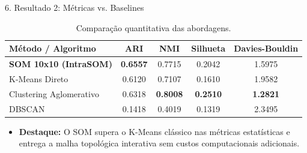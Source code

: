 \documentclass[10pt,aspectratio=169]{beamer}
\begin{document}
\begin{frame}{6. Resultado 2: Métricas vs. Baselines}
  \begin{table}
    \centering
    \begin{tabular}{lcccc}
      \toprule
      Método / Algoritmo & ARI & NMI & Silhueta & Davies-Bouldin \\
      \midrule
      \textbf{SOM 10x10 (IntraSOM)} & \textbf{0.6557} & 0.7715 & 0.2042 & 1.5975 \\
      K-Means Direto & 0.6120 & 0.7107 & 0.1610 & 1.9582 \\
      Clustering Aglomerativo & 0.6318 & \textbf{0.8008} & \textbf{0.2510} & \textbf{1.2821} \\
      DBSCAN & 0.1418 & 0.4019 & 0.1319 & 2.3495 \\
      \bottomrule
    \end{tabular}
    \caption{Comparação quantitativa das abordagens.}
  \end{table}
  \begin{itemize}
    \item \textbf{Destaque:} O SOM supera o K-Means clássico nas métricas estatísticas e entrega a malha topológica interativa sem custos computacionais adicionais.
  \end{itemize}
\end{frame}
\end{document}
